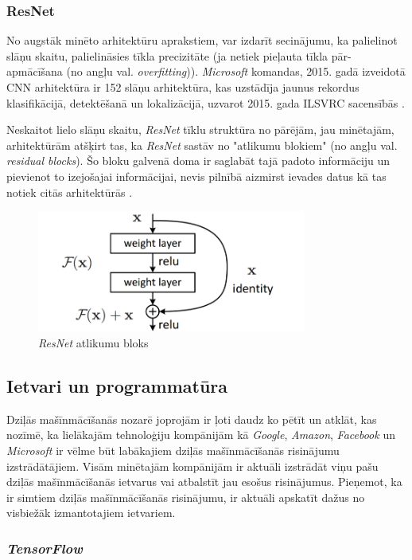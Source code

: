 \subsubsection{ResNet}
No augstāk minēto arhitektūru aprakstiem, var izdarīt secinājumu, ka palielinot slāņu skaitu, palielināsies tīkla precizitāte (ja netiek pieļauta tīkla pār-apmācīšana (no angļu val. \textit{overfitting})). \textit{Microsoft} komandas, 2015. gadā izveidotā CNN arhitektūra ir 152 slāņu arhitektūra, kas uzstādīja jaunus rekordus klasifikācijā, detektēšanā un lokalizācijā, uzvarot 2015. gada ILSVRC sacensībās \cite{ILSVRC15}. 

Neskaitot lielo slāņu skaitu,    \textit{ResNet} tīklu struktūra no pārējām, jau minētajām, arhitektūrām atšķirt tas, ka \textit{ResNet} sastāv no "atlikumu blokiem" (no angļu val. \textit{residual blocks}). Šo bloku galvenā doma ir saglabāt tajā padoto informāciju un pievienot to izejošajai informācijai, nevis pilnībā aizmirst ievades datus kā tas notiek citās arhitektūrās \cite{he2016deep}. 

\begin{figure}[H]%
	\centering
	\includegraphics[height=4cm]{images/resnet.png} %
	\caption{\textit{ResNet} atlikumu bloks \cite{he2016deep}}%
	\label{fig:example}%
\end{figure}
\subsection{Ietvari un programmatūra}
Dziļās mašīnmācīšanās nozarē joprojām ir ļoti daudz ko pētīt un atklāt, kas nozīmē, ka lielākajām tehnoloģiju kompānijām kā \textit{Google}, \textit{Amazon}, \textit{Facebook} un \textit{Microsoft} ir vēlme būt labākajiem dziļās mašīnmācīšanās risinājumu izstrādātājiem. Visām minētajām kompānijām ir aktuāli izstrādāt viņu pašu dziļās mašīnmācīšanās ietvarus vai atbalstīt jau esošus risinājumus. Pieņemot, ka ir simtiem dziļās mašīnmācīšanās risinājumu, ir aktuāli apskatīt dažus no visbiežāk izmantotajiem ietvariem.

\subsubsection{\textit{TensorFlow}}

